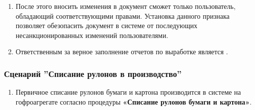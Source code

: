 \begin{enumerate}
    \item После этого вносить изменения в документ сможет только пользователь, обладающий соответствующими правами. Установка данного признака позволяет обезопасить документ в системе \gofro от последующих несанкционированных изменений пользователями.

    \item 	Ответственным за верное заполнение отчетов по выработке является \master.


\end{enumerate}



\subsubsection{Сценарий ''Списание рулонов в производство''}
\label{bp:production_10}

\begin{enumerate}
\item Первичное списание рулонов бумаги и картона производится  в системе \gofro на гофроагрегате согласно процедуры \textbf{«Списание рулонов бумаги и картона»}.
\end{enumerate}




